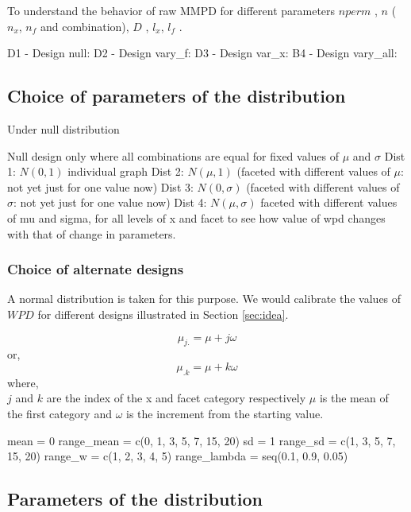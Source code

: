 \documentclass[
]{article}
\begin{document}
To understand the behavior of raw MMPD for different parameters \(nperm\) , \(n\) (\(n_x\), \(n_f\) and combination), \(D\) , \(l_x\), \(l_f\) .

D1 - Design null:
D2 - Design vary\_f:
D3 - Design var\_x:
B4 - Design vary\_all:

\hypertarget{choice-of-parameters-of-the-distribution}{%
\subsection{Choice of parameters of the distribution}\label{choice-of-parameters-of-the-distribution}}

Under null distribution

Null design only where all combinations are equal for fixed values of \(\mu\) and \(\sigma\)
Dist 1: \(N(0,1)\) individual graph
Dist 2: \(N(\mu, 1)\) (faceted with different values of \(\mu\): not yet just for one value now)
Dist 3: \(N(0, \sigma)\) (faceted with different values of \(\sigma\): not yet just for one value now)
Dist 4: \(N(\mu, \sigma)\) faceted with different values of mu and sigma, for all levels of x and facet to see how value of wpd changes with that of change in parameters.

\hypertarget{choice-of-alternate-designs}{%
\subsubsection{Choice of alternate designs}\label{choice-of-alternate-designs}}

A normal distribution is taken for this purpose. We would calibrate the values of \(WPD\) for different designs illustrated in Section \ref{sec:idea}.

\[\mu_{j.} = \mu + j\omega\]
or, \[\mu_{.k} = \mu + k\omega\] where,\\
\(j\) and \(k\) are the index of the x and facet category respectively
\(\mu\) is the mean of the first category and \(\omega\) is the increment from the starting value.

mean = 0
range\_mean = c(0, 1, 3, 5, 7, 15, 20)
sd = 1
range\_sd = c(1, 3, 5, 7, 15, 20)
range\_w = c(1, 2, 3, 4, 5)
range\_lambda = seq(0.1, 0.9, 0.05)

\hypertarget{parameters-of-the-distribution}{%
\subsection{Parameters of the distribution}\label{parameters-of-the-distribution}}
\end{document}

